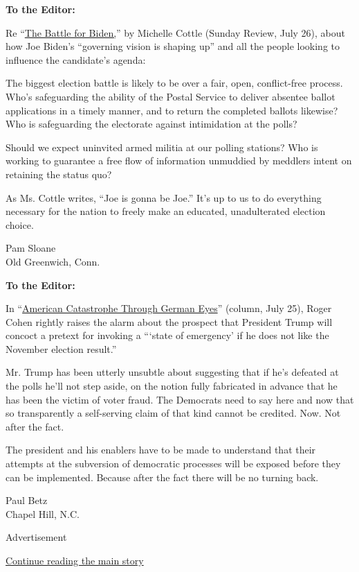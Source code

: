\textbf{To the Editor:}

Re
``\href{https://www.nytimes3xbfgragh.onion/2020/07/24/opinion/sunday/joe-biden-2020.html}{The
Battle for Biden,}'' by Michelle Cottle (Sunday Review, July 26), about
how Joe Biden's ``governing vision is shaping up'' and all the people
looking to influence the candidate's agenda:

The biggest election battle is likely to be over a fair, open,
conflict-free process. Who's safeguarding the ability of the Postal
Service to deliver absentee ballot applications in a timely manner, and
to return the completed ballots likewise? Who is safeguarding the
electorate against intimidation at the polls?

Should we expect uninvited armed militia at our polling stations? Who is
working to guarantee a free flow of information unmuddied by meddlers
intent on retaining the status quo?

As Ms. Cottle writes, ``Joe is gonna be Joe.'' It's up to us to do
everything necessary for the nation to freely make an educated,
unadulterated election choice.

Pam Sloane\\
Old Greenwich, Conn.

\textbf{To the Editor:}

In
``\href{https://www.nytimes3xbfgragh.onion/2020/07/24/opinion/trump-germany.html}{American
Catastrophe Through German Eyes}'' (column, July 25), Roger Cohen
rightly raises the alarm about the prospect that President Trump will
concoct a pretext for invoking a ```state of emergency' if he does not
like the November election result.''

Mr. Trump has been utterly unsubtle about suggesting that if he's
defeated at the polls he'll not step aside, on the notion fully
fabricated in advance that he has been the victim of voter fraud. The
Democrats need to say here and now that so transparently a self-serving
claim of that kind cannot be credited. Now. Not after the fact.

The president and his enablers have to be made to understand that their
attempts at the subversion of democratic processes will be exposed
before they can be implemented. Because after the fact there will be no
turning back.

Paul Betz\\
Chapel Hill, N.C.

Advertisement

\protect\hyperlink{after-bottom}{Continue reading the main story}

